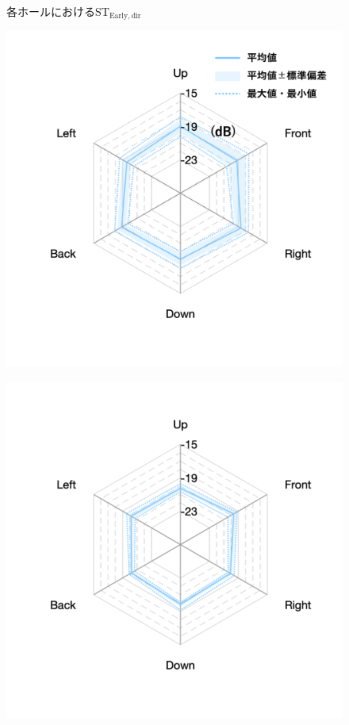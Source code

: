 \documentclass[11pt,a4j]{jreport}
\begin{document}
\begin{figure}[H]
\caption{各ホールにおける$\mathrm{ST_{Early,dir}}$}
\label{fig:各ホールにおけるSTEarly}
\end{figure}


\newpage
\begin{figure}[H]
  \begin{minipage}[b]{.33\textwidth}
      \centering
      \includegraphics[width=1\linewidth]{images/realHallDirSt/late_hall_a_withLegend.png}
      \label{fig:ホールAにおけるSTlate}
  \end{minipage}%
  \begin{minipage}[b]{.33\textwidth}
    \centering
    \includegraphics[width=1\linewidth]{images/realHallDirSt/late_hall_b_allpoints.png}

\end{minipage}
\end{figure}
\end{document}
